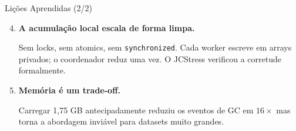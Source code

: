\begin{frame}{Lições Aprendidas (2/2)}
    \begin{enumerate}
        \setcounter{enumi}{3}
        \item \textbf{A acumulação local escala de forma limpa.}

              Sem locks, sem atomics, sem \texttt{synchronized}. Cada worker
              escreve em arrays privados; o coordenador reduz uma vez.
              O JCStress verificou a corretude formalmente.

        \bigskip
        \item \textbf{Memória é um trade-off.}

              Carregar 1,75 GB antecipadamente reduziu os eventos de GC em $16\times$
              mas torna a abordagem inviável para datasets muito grandes.
    \end{enumerate}
\end{frame}
